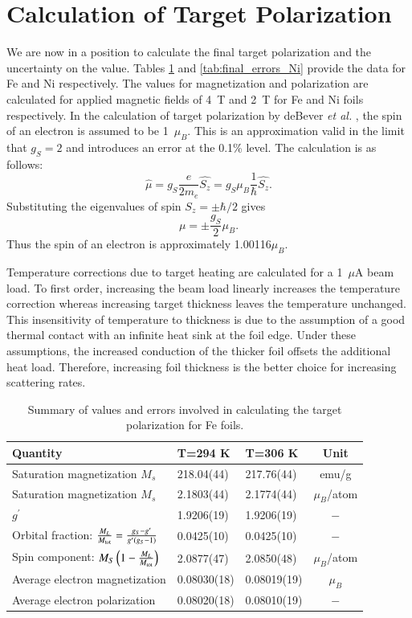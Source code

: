 \documentclass[preprint,12pt]{elsarticle}
\begin{document}
{\section{Calculation of Target Polarization}\label{sec:final_calc}
We are now in a position to calculate the final target polarization and the uncertainty on the value. Tables \ref{tab:final_errors_Fe} and \ref{tab:final_errors_Ni} provide the data for Fe and Ni respectively. The values for magnetization and polarization are calculated for applied magnetic fields of 4~T and 2~T for Fe and Ni foils respectively. In the calculation of target polarization by deBever {\it et al.} \cite{deBever1997}, the spin of an electron is assumed to be 1~$\mu_B$. This is an approximation valid in the limit that $g_{S}=2$ and introduces an error at the 0.1\% level. The calculation is as follows:
\[
\hat{\mu}=g_{S}\frac{e}{2m_e}\hat{S_z}=g_{S}\mu_B\frac{1}{\hbar}\hat{S_z}.
\]
Substituting the eigenvalues of spin $S_z=\pm\hbar/2$ gives
\[
\mu=\pm\frac{g_{S}}{2}\mu_B.
\]
Thus the spin of an electron is approximately 1.00116$\mu_B$.

Temperature corrections due to target heating are calculated for a 1~$\mu$A beam load. To first order, increasing the beam load linearly increases the temperature correction whereas increasing target thickness leaves the temperature unchanged. This insensitivity of temperature to thickness is due to the assumption of a good thermal contact with an infinite heat sink at the foil edge. Under these assumptions, the increased conduction of the thicker foil offsets the additional heat load. Therefore, increasing foil thickness is the better choice for increasing scattering rates. 
\begin{table}[h]
\caption{\label{tab:final_errors_Fe}Summary of values and errors involved in calculating the target polarization for Fe foils.}
\begin{center}
\begin{tabular}{|l|l|l|c|}\hline
Quantity&T=294 K&T=306 K&Unit\\\hline
Saturation magnetization $M_s$ &218.04(44)&217.76(44)&emu/g\\
Saturation magnetization $M_s$&2.1803(44)&2.1774(44)&$\mu_B$/atom\\
$g^{\prime}$&1.9206(19)&1.9206(19)&$-$\\
Orbital fraction: $\frac{M_{L}}{M_{\rm tot}}=\frac{g_{S}-g^\prime}{g^\prime(g_{S}-1)}$&0.0425(10)&0.0425(10)&$-$\\
Spin component: $M_S\left(1-\frac{M_{L}}{M_{\rm tot}}\right)$&2.0877(47)&2.0850(48)&$\mu_B$/atom\\
Average electron magnetization&0.08030(18)&0.08019(19)&$\mu_B$\\
Average electron polarization&0.08020(18)&0.08010(19)&$-$\\\hline
\end{tabular}
\end{center}
\end{table}


}
\end{document}
